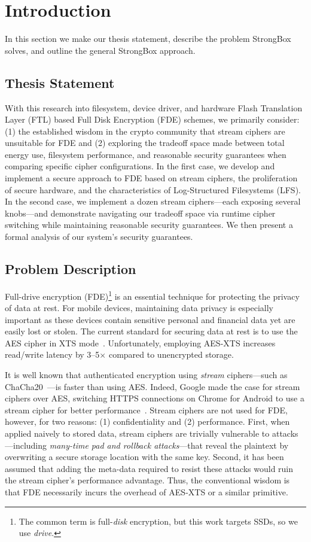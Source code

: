 \chapter{Introduction} \label{chp:introduction}

In this section we make our thesis statement, describe the problem StrongBox
solves, and outline the general StrongBox approach.

\section{Thesis Statement}

With this research into filesystem, device driver, and hardware Flash
Translation Layer (FTL) based Full Disk Encryption (FDE) schemes, we primarily
consider: (1) the established wisdom in the crypto community that stream ciphers
are unsuitable for FDE and (2) exploring the tradeoff space made between total
energy use, filesystem performance, and reasonable security guarantees when
comparing specific cipher configurations. In the first case, we develop and
implement a secure approach to FDE based on stream ciphers, the proliferation of
secure hardware, and the characteristics of Log-Structured Filesystems (LFS). In
the second case, we implement a dozen stream ciphers---each exposing several
knobs---and demonstrate navigating our tradeoff space via runtime cipher
switching while maintaining reasonable security guarantees. We then present a
formal analysis of our system's security guarantees.

\section{Problem Description}

Full-drive encryption (FDE)\footnote{The common term is full-\emph{disk}
encryption, but this work targets SSDs, so we use \emph{drive}.} is an essential
technique for protecting the privacy of data at rest. For mobile devices,
maintaining data privacy is especially important as these devices contain
sensitive personal and financial data yet are easily lost or stolen. The current
standard for securing data at rest is to use the AES cipher in XTS
mode~\cite{XTS, NISTXTS}. Unfortunately, employing AES-XTS increases read/write
latency by 3--5$\times$ compared to unencrypted storage.

It is well known that authenticated encryption using \emph{stream}
ciphers---such as ChaCha20~\cite{ChaCha20}---is faster than using AES. Indeed,
Google made the case for stream ciphers over AES, switching HTTPS connections on
Chrome for Android to use a stream cipher for better
performance~\cite{google-blog}. Stream ciphers are not used for FDE, however,
for two reasons: (1) confidentiality and (2) performance. First, when applied
naively to stored data, stream ciphers are trivially vulnerable to
attacks---including \emph{many-time pad and rollback attacks}---that reveal the
plaintext by overwriting a secure storage location with the same key. Second, it
has been assumed that adding the meta-data required to resist these attacks
would ruin the stream cipher's performance advantage. Thus, the conventional
wisdom is that FDE necessarily incurs the overhead of AES-XTS or a similar
primitive.

